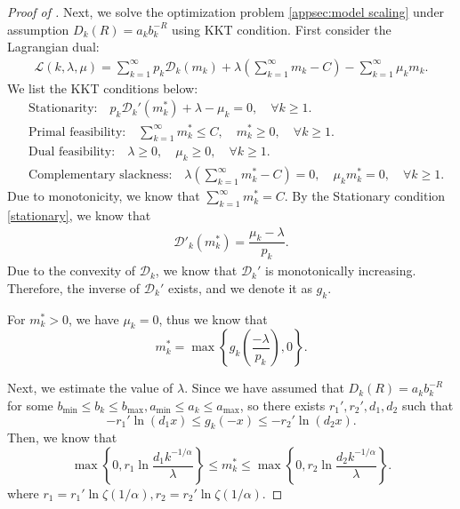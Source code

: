 \documentclass[11pt]{article}
\theoremstyle{plain}
\theoremstyle{definition}
\newcommand{\ratedistortion}{\mathcal{D}}
\newcommand{\zhixuan}[1]{{\it \color{blue}{zhixuan: #1}}}
\begin{document}
\begin{proof}[Proof of ]
Next, we solve the optimization problem \eqref{appsec:model scaling} under assumption $D_k(R)=a_kb_k^{-R}$ using KKT condition.
First consider the Lagrangian dual:
\begin{align*}
    \mathcal{L}(k, \lambda, \mu) = \sum_{k=1}^{\infty} p_k \ratedistortion_k(m_k) + \lambda \left(\sum_{k=1}^{\infty} m_k - C\right) - \sum_{k=1}^{\infty} \mu_k m_k. 
\end{align*}
We list the KKT conditions below:
\begin{align}
\label{stationary}
    & \text{Stationarity:} \quad p_k \ratedistortion_k'(m_k^*) + \lambda - \mu_k = 0, \quad \forall k \geq 1. \\
    & \text{Primal feasibility:} \quad \sum_{k=1}^{\infty} m_k^* \leq C, \quad m_k^* \geq 0, \quad \forall k \geq 1. \\
    & \text{Dual feasibility:} \quad \lambda \geq 0, \quad \mu_k \geq 0, \quad \forall k \geq 1. \\
    & \text{Complementary slackness:} \quad \lambda \left( \sum_{k=1}^{\infty} m_k^* - C\right) = 0, \quad \mu_k m_k^* = 0, \quad \forall k \geq 1.
\end{align}
Due to monotonicity, we know that $\sum\limits_{k=1}^{\infty} m_k^* = C$. 
By the Stationary condition \eqref{stationary}, we know that
\begin{align*}
   \ratedistortion'_k(m_k^*)= \dfrac{\mu_k-\lambda}{p_k}.
\end{align*}
Due to the convexity of $\ratedistortion_k$\citep{cover2006elements}, we know that $\ratedistortion_k'$ is monotonically increasing. Therefore, the inverse of $\ratedistortion_k'$ exists, and we denote it as $g_k$.


For $m_k^*>0$, we have $\mu_k=0$, thus we know that 
\[m_k^*=\max\left\{g_k\left(\dfrac{-\lambda}{p_k}\right),0\right\}.\]

Next, we estimate the value of $\lambda$. 
Since we have assumed that $D_k(R)=a_kb_k^{-R}$ for some $b_{\min}\le b_k\le b_{\max},a_{\min}\le a_k\le a_{\max}$, so there exists $r_1',r_2',d_1,d_2$ such that 
\[
-r_1'\ln(d_1x)\le g_k(-x)\le -r_2'\ln(d_2x).
\]
Then, we know that \[
\max\left\{0,r_1\ln \dfrac{d_1k^{-1/\alpha}}{\lambda}\right\} \le m_k^*\le  \max\left\{0,r_2\ln \dfrac{d_2k^{-1/\alpha}}{\lambda}\right\}.
\] 
where $r_1=r_1'\ln \zeta(1/\alpha), r_2=r_2'\ln\zeta(1/\alpha)$. 


\end{proof}
\end{document}

